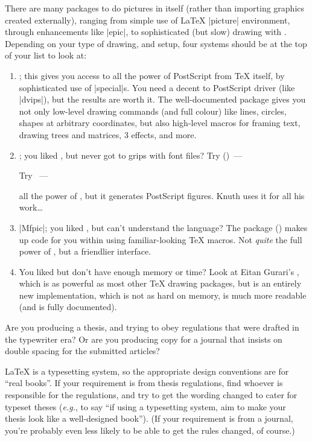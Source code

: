 
There are many packages to do pictures in \AllTeX{} itself (rather than
importing graphics created externally), ranging from simple use of
\LaTeX{} |picture| environment, through enhancements like \ProgName|epic|, to
sophisticated (but slow) drawing with \PiCTeX{}. Depending on your type
of drawing, and setup, four systems should be at the top of your list
to look at:
\begin{enumerate}
\item {}; this gives you access to all the power of
  PostScript from \TeX{} itself, by sophisticated use of
  \cs|special|s. You need a decent  to PostScript driver
  (like \ProgName|dvips|), but the results are worth it.  The
  well-documented package gives you not only low-level drawing
  commands (and full colour) like lines, circles, shapes at arbitrary
  coordinates, but also high-level macros for framing text, drawing
  trees and matrices, 3 effects, and more.
\item \MP{}; you liked \MF{}, but never got to grips with font files?
\htmlignore
  Try \MP{} ()~---
\endhtmlignore
\begin{htmlversion}
  Try ~---
\end{htmlversion}
  all the power of \MF{}, but it generates PostScript figures.  Knuth
  uses it for all his work\dots{}
\item \ProgName|Mfpic|; you liked \MF{}, but can't understand the
  language?  The package () makes up \MF{} code for you
  within using familiar-looking \TeX{} macros.  Not \emph{quite} the
  full power of \MF{}, but a friendlier interface.
\item You liked \PiCTeX{} but don't have enough memory or time?  Look
  at Eitan Gurari's , which is as powerful as most
  other \TeX{} drawing packages, but is an entirely new
  implementation, which is not as hard on memory, is much more
  readable (and is fully documented).
\end{enumerate}


Are you producing a thesis, and trying to obey regulations that were
drafted in the typewriter era?  Or are you producing copy for a
journal that insists on double spacing for the submitted articles?

\LaTeX{} is a typesetting system, so the appropriate design
conventions are for ``real books''.  If your requirement is from
thesis regulations, find whoever is responsible for the regulations,
and try to get the wording changed to cater for typeset theses
(\emph{e.g.}, to say ``if using a typesetting system, aim to make your
thesis look like a well-designed book'').  (If your requirement is
from a journal, you're probably even less likely to be able to get the
rules changed, of course.)

